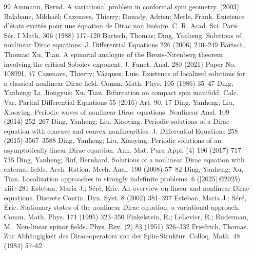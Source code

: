 \documentclass[10pt,a4paper]{amsart}
\begin{document}
\begin{thebibliography}{99}
 Ammann, Bernd. A variational problem in conformal spin geometry. (2003)
 Balabane, Mikha\"el; Cazenave, Thierry; Douady, Adrien; Merle, Frank. Existence d'\'etats excit\'es pour une \'equation de {D}irac non lin\'eaire. C. R. Acad. Sci. Paris S\'er. I Math. 306 (1988) 117--120
 Bartsch, Thomas; Ding, Yanheng. Solutions of nonlinear {D}irac equations. J. Differential Equations 226 (2006) 210--249
 Bartsch, Thomas; Xu, Tian. A spinorial analogue of the {B}rezis-{N}irenberg theorem involving the critical {S}obolev exponent. J. Funct. Anal. 280 (2021) Paper No. 108991, 47
 Cazenave, Thierry; V\'azquez, Luis. Existence of localized solutions for a classical nonlinear {D}irac field. Comm. Math. Phys. 105 (1986) 35--47
 Ding, Yanheng; Li, Jiongyue; Xu, Tian. Bifurcation on compact spin manifold. Calc. Var. Partial Differential Equations 55 (2016) Art. 90, 17
 Ding, Yanheng; Liu, Xiaoying. Periodic waves of nonlinear {D}irac equations. Nonlinear Anal. 109 (2014) 252--267
 Ding, Yanheng; Liu, Xiaoying. Periodic solutions of a {D}irac equation with concave and convex nonlinearities. J. Differential Equations 258 (2015) 3567--3588
 Ding, Yanheng; Liu, Xiaoying. Periodic solutions of an asymptotically linear {D}irac equation. Ann. Mat. Pura Appl. (4) 196 (2017) 717--735
 Ding, Yanheng; Ruf, Bernhard. Solutions of a nonlinear {D}irac equation with external fields. Arch. Ration. Mech. Anal. 190 (2008) 57--82
 Ding, Yanheng; Xu, Tian. Localization approaches in strongly indefinite problems. 6 ([2025] \copyright 2025) xiii+281
 Esteban, Maria J.; S\'er\'e, Eric. An overview on linear and nonlinear {D}irac equations. Discrete Contin. Dyn. Syst. 8 (2002) 381--397
 Esteban, Maria J.; S\'er\'e, \'Eric. Stationary states of the nonlinear {D}irac equation: a variational approach. Comm. Math. Phys. 171 (1995) 323--350
 Finkelstein, R.; LeLevier, R.; Ruderman, M.. Non-linear spinor fields. Phys. Rev. (2) 83 (1951) 326--332
 Friedrich, Thomas. Zur {A}bh\"angigkeit des {D}irac-operators von der {S}pin-{S}truktur. Colloq. Math. 48 (1984) 57--62

\end{thebibliography}
\end{document}
